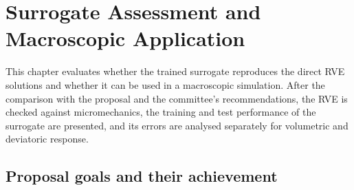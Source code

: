 \chapter{Surrogate Assessment and Macroscopic Application}\label{ch:assessment}

This chapter evaluates whether the trained surrogate reproduces the direct RVE
solutions and whether it can be used in a macroscopic simulation. After the
comparison with the proposal and the committee's recommendations, the RVE is checked
against micromechanics, the training and test performance of the surrogate are
presented, and its errors are analysed separately for volumetric and deviatoric
response.

\section{Proposal goals and their achievement}

